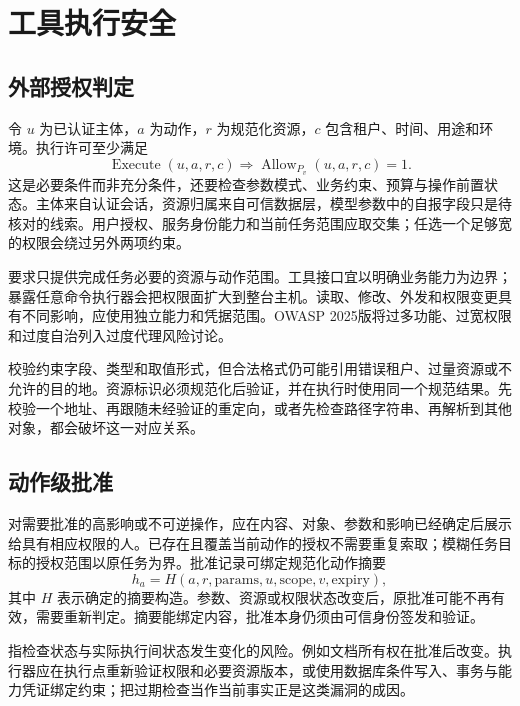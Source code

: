 \documentclass[../textbook.tex]{subfiles}
\begin{document}
\section{工具执行安全}

\subsection{外部授权判定}
令 $u$ 为已认证主体，$a$ 为动作，$r$ 为规范化资源，$c$ 包含租户、时间、用途和环境。执行许可至少满足
\begin{equation}
 \operatorname{Execute}(u,a,r,c)
 \Longrightarrow \operatorname{Allow}_{P_v}(u,a,r,c)=1.
 \label{eq:security-allow}
\end{equation}
这是必要条件而非充分条件，还要检查参数模式、业务约束、预算与操作前置状态。主体来自认证会话，资源归属来自可信数据层，模型参数中的自报字段只是待核对的线索。用户授权、服务身份能力和当前任务范围应取交集；任选一个足够宽的权限会绕过另外两项约束。

要求只提供完成任务必要的资源与动作范围。工具接口宜以明确业务能力为边界；暴露任意命令执行器会把权限面扩大到整台主机。读取、修改、外发和权限变更具有不同影响，应使用独立能力和凭据范围。OWASP 2025版将过多功能、过宽权限和过度自治列入过度代理风险讨论\cite{owasp2025agency}。

校验约束字段、类型和取值形式，但合法格式仍可能引用错误租户、过量资源或不允许的目的地。资源标识必须规范化后验证，并在执行时使用同一个规范结果。先校验一个地址、再跟随未经验证的重定向，或者先检查路径字符串、再解析到其他对象，都会破坏这一对应关系。

\subsection{动作级批准}
对需要批准的高影响或不可逆操作，应在内容、对象、参数和影响已经确定后展示给具有相应权限的人。已存在且覆盖当前动作的授权不需要重复索取；模糊任务目标的授权范围以原任务为界。批准记录可绑定规范化动作摘要
\begin{equation}
 h_a=H(a,r,\mathrm{params},u,\mathrm{scope},v,\mathrm{expiry}),
\end{equation}
其中 $H$ 表示确定的摘要构造。参数、资源或权限状态改变后，原批准可能不再有效，需要重新判定。摘要能绑定内容，批准本身仍须由可信身份签发和验证。

指检查状态与实际执行间状态发生变化的风险。例如文档所有权在批准后改变。执行器应在执行点重新验证权限和必要资源版本，或使用数据库条件写入、事务与能力凭证绑定约束；把过期检查当作当前事实正是这类漏洞的成因。
\end{document}

